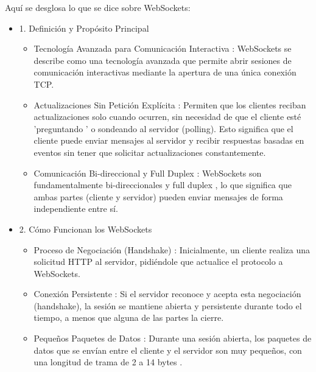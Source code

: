 \documentclass{report}
\begin{document}
Aquí se desglosa lo que se  dice sobre WebSockets:
\begin{itemize}
    \item 1. Definición y Propósito Principal
    \begin{itemize}
        \item  Tecnología Avanzada para Comunicación Interactiva : WebSockets se describe como una tecnología avanzada que permite abrir sesiones de 
        comunicación interactivas mediante la apertura de una única conexión TCP.
        \item  Actualizaciones Sin Petición Explícita : Permiten que los clientes reciban actualizaciones solo cuando ocurren,  sin necesidad de que el 
        cliente esté  'preguntando ' o sondeando al servidor  (polling). Esto significa que el cliente puede enviar mensajes al servidor y recibir 
        respuestas basadas en eventos sin tener que solicitar actualizaciones constantemente.
        \item  Comunicación Bi-direccional y Full Duplex : WebSockets son fundamentalmente  bi-direccionales y full duplex , lo que significa que 
        ambas partes (cliente y servidor) pueden enviar mensajes de forma independiente entre sí.
    \end{itemize}

    \item 2. Cómo Funcionan los WebSockets
    \begin{itemize}
        \item  Proceso de Negociación (Handshake) : Inicialmente, un cliente realiza una solicitud HTTP al servidor, pidiéndole que actualice el 
        protocolo a WebSockets.
        \item  Conexión Persistente : Si el servidor reconoce y acepta esta negociación (handshake), la  sesión se mantiene abierta y persistente  
        durante todo el tiempo, a menos que alguna de las partes la cierre.
        \item  Pequeños Paquetes de Datos : Durante una sesión abierta, los paquetes de datos que se envían entre el cliente y el servidor son muy 
        pequeños, con una  longitud de trama de 2 a 14 bytes .
    \end{itemize}


\end{itemize}
\end{document}
